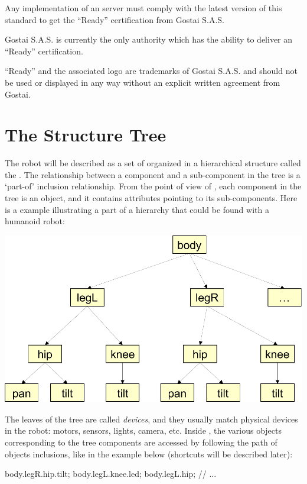 Any implementation of an \urbi server must comply with the latest
version of this standard to get the ``\urbi Ready'' certification from
Gostai S.A.S.


Gostai S.A.S. is currently the only authority which has the ability to
deliver an ``\urbi Ready'' certification.

``\urbi Ready'' and the associated logo are trademarks of Gostai
S.A.S. and should not be used or displayed in any way without an
explicit written agreement from Gostai.

\section{The Structure Tree}

The robot will be described as a set of  organized
in a hierarchical structure called the . The
relationship between a component and a sub-component in the tree is a
`part-of' inclusion relationship. From the point of view of \urbi,
each component in the tree is an object, and it contains attributes
pointing to its sub-components. Here is a example illustrating a part
of a hierarchy that could be found with a humanoid robot:

\begin{center}
  \includegraphics[width=.8\linewidth]{img/structure-tree}
\end{center}

The leaves of the tree are called \textit{devices}, and they usually
match physical devices in the robot: motors, sensors, lights, camera,
etc. Inside \urbi, the various objects corresponding to the tree
components are accessed by following the path of objects inclusions,
like in the example below (shortcuts will be described later):

\begin{urbifixme}
body.legR.hip.tilt;
body.legL.knee.led;
body.legL.hip;
// ...
\end{urbifixme}


